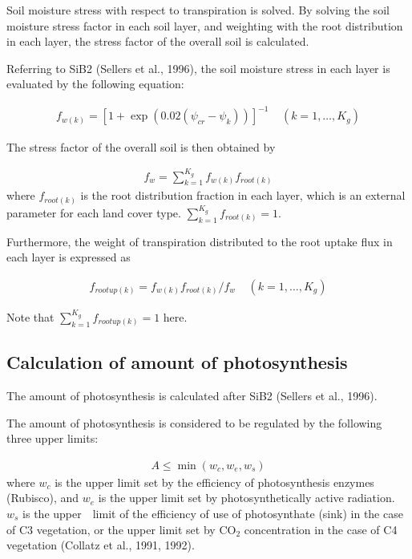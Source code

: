 Soil moisture stress with respect to transpiration is solved. By solving the soil moisture stress factor in each soil layer, and weighting with the root distribution in each layer, the stress factor
of the overall soil is calculated.

Referring to SiB2 (Sellers et al., 1996), the soil moisture stress in each layer is evaluated by the following equation:

\begin{eqnarray}
 f_{w(k)} = [ 1 + \exp( 0.02 (\psi_{cr} - \psi_{k}) ) ]^{-1}
\ \ \ \ \ (k=1,\ldots,K_g)
\end{eqnarray}

The stress factor of the overall soil is then obtained by

\begin{eqnarray}
 f_w = \sum_{k=1}^{K_g} f_{w(k)} f_{root(k)}
\end{eqnarray} where \(f_{root(k)}\) is the root distribution fraction in each layer, which is an external parameter for each land cover type. \(\sum_{k=1}^{K_g} f_{root(k)}=1\).　

Furthermore, the weight of transpiration distributed to the root uptake flux in each layer is expressed as

\begin{eqnarray}
 f_{rootup(k)} = f_{w(k)} f_{root(k)} / f_w
\ \ \ \ \ (k=1,\ldots,K_g)
\end{eqnarray}

Note that \(\sum_{k=1}^{K_g} f_{rootup(k)} = 1\) here.

\hypertarget{calculation-of-amount-of-photosynthesis}{%
\subsection{Calculation of amount of photosynthesis}\label{calculation-of-amount-of-photosynthesis}}

The amount of photosynthesis is calculated after SiB2 (Sellers et al., 1996).

The amount of photosynthesis is considered to be regulated by the following three upper limits:

\begin{eqnarray}
 A \leq \min( w_c, w_e, w_s) \label{eq76}
\end{eqnarray} where \(w_c\) is the upper limit set by the efficiency of photosynthesis enzymes (Rubisco), and \(w_e\) is the upper limit set by photosynthetically active radiation. \(w_s\) is the upper　limit of
the efficiency of use of photosynthate (sink) in the case of C3 vegetation, or the upper limit set by \(\mathrm{CO_2}\) concentration in the case of C4 vegetation (Collatz et al., 1991, 1992).

